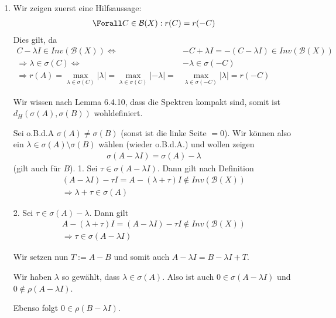 \begin{solution}
\begin{enumerate}[label = (\alph*)]

\item
Wir zeigen zuerst eine Hilfsaussage:
\begin{align}\label{Lemmachen}
  \Forall C \in \mathcal{B}(X): r(C) = r(-C)
\end{align}
Dies gilt, da
\begin{align*}
  C - \lambda I \in Inv(\mathcal{B}(X)) \Leftrightarrow & -C + \lambda I = -(C - \lambda I) \in Inv(\mathcal{B}(X)) \\
  \Rightarrow \lambda \in \sigma (C) \Leftrightarrow & -\lambda \in \sigma (-C) \\
  \Rightarrow r(A) = \max_{\lambda \in \sigma (C)} |\lambda| = \max_{\lambda \in \sigma (C)} |-\lambda| = & \max_{\lambda \in \sigma (-C)} |\lambda| = r(-C)
\end{align*}

Wir wissen nach Lemma 6.4.10, dass die Spektren kompakt sind, somit ist $d_H(\sigma(A), \sigma(B))$ wohldefiniert.

Sei o.B.d.A $\sigma(A) \neq \sigma(B)$ (sonst ist die linke Seite $=0$). Wir können also ein $\lambda \in \sigma(A) \setminus \sigma(B)$ wählen (wieder o.B.d.A.) und wollen zeigen
\begin{align}\label{minuslambda}
  \sigma(A-\lambda I) = \sigma(A) - \lambda
\end{align}
(gilt auch für $B$).
1. Sei $\tau \in \sigma(A-\lambda I)$. Dann gilt nach Definition
\begin{align*}
  (A-\lambda I) - \tau I = A - (\lambda + \tau) I \notin Inv(\mathcal{B}(X)) \\
  \Rightarrow \lambda + \tau \in \sigma(A)
\end{align*}

2. Sei $\tau \in \sigma(A) - \lambda$. Dann gilt
\begin{align*}
  A - (\lambda + \tau) I = (A - \lambda I) -\tau I \notin Inv(\mathcal{B}(X)) \\
  \Rightarrow \tau \in \sigma(A - \lambda I)
\end{align*}

Wir setzen nun $T := A - B$ und somit auch $A- \lambda I = B - \lambda I + T$.

Wir haben $\lambda$ so gewählt, dass $\lambda \in \sigma(A)$. Also ist auch $0 \in \sigma(A - \lambda I)$ und $0 \notin \rho(A - \lambda I)$.

Ebenso folgt $0 \in \rho(B - \lambda I)$.


\end{enumerate}
\end{solution}
